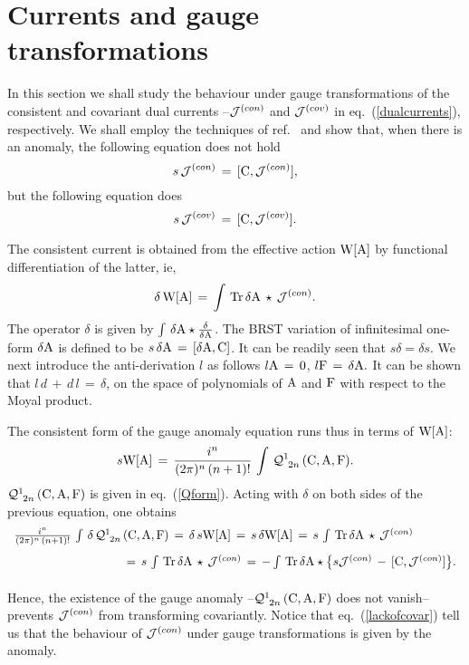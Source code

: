 \documentclass[a4paper,12pt]{article}
\def\cJ{{\cal J}}
\def\cQ{{\cal Q}}
\def\A{{\rm A}}
\def\C{{\rm C}}
\def\F{{\rm F}}
\def\W{{\rm W}}
\begin{document}
\section{Currents and gauge transformations}

In this section we shall study the behaviour under gauge transformations 
of the consistent and covariant dual currents --$\cJ^{(con)}$ and
$\cJ^{(cov)}$ in eq.~(\ref{dualcurrents}), respectively. We shall employ the
techniques of ref.~\cite{Alvarez-Gaume:1985dr} and show that, when
there is an anomaly, the following equation does not hold
\begin{displaymath}
s\,\cJ^{(con)}\,=\,[\C,\cJ^{(con)}],
\end{displaymath} 
but the following equation does
\begin{equation}
s\,\cJ^{(cov)}\,=\,[\C,\cJ^{(cov)}].
\label{covlaw}
\end{equation}

 The consistent current is obtained from the effective action $\W[\A]$ by
functional differentiation of the latter, ie,
\begin{displaymath}
\delta\,\W[\A]\,=\,\int\,{\rm Tr}\,\delta\A\, \star\,\cJ^{(con)}.
\end{displaymath}
The operator $\delta$ is given by $\int\,\delta\A\star\frac{\delta}{\delta\A}$.
The BRST variation of infinitesimal one-form $\delta\A$ is defined to be
$s\,\delta\A\,=\,[\delta\A,\C]$. It can be readily seen that 
$s\delta=\delta s$.
We next introduce the anti-derivation $l$ as follows
$l\A\,=\,0$, $l\F\,=\,\delta\A.$ It can be shown that 
$l\,d\,+\,d\,l\,=\,\delta$, on the space of polynomials of $\A$ and $\F$ 
with respect to the Moyal product. 

The consistent form of the gauge anomaly equation runs thus in terms 
of $\W[\A]$:
\begin{displaymath}
s\W[\A]\,=\,\frac{i^n}{(2\pi)^n\,(n+1)!}\,\int\, \cQ^{1}_{\;\,2n}
\,(\C,\A,\F).  
\end{displaymath}
$\cQ^{1}_{\;\,2n}\,(\C,\A,\F)$ is given in eq.~(\ref{Qform}).  
Acting with $\delta$ on both sides of the previous equation, one obtains
\begin{equation}
\begin{array}{l}
{\frac{i^n}{(2\pi)^n\,(n+1)!}\,\int\, \delta\,\cQ^{1}_{\;\,2n}
\,(\C,\A,\F)\,=\,\delta\,s\W[\A]\,=\,s\,\delta\W[\A]
\,=\,s\,\int\,{\rm Tr}\,\delta\A\, \star\,\cJ^{(con)}}\\[9pt]
{\phantom{\frac{i^n}{(2\pi)^n\,(n+1)!}\,\int\, \delta\,\cQ^{1}_{\;\,2n}}
\,=\,s\,\int\,{\rm Tr}\,\delta\A\, \star\,\cJ^{(con)}
   \,=\,-\int\,{\rm Tr}\,\delta\A\star\big\{s\cJ^{(con)}\,-\,
[\C,\cJ^{(con)}]
\big\}.}\\[9pt]
\end{array}
\label{lackofcovar}
\end{equation}
Hence, the existence of the gauge anomaly 
--$\cQ^{1}_{\;\,2n}\,(\C,\A,\F)$ does not vanish-- prevents $\cJ^{(con)}$ 
from transforming covariantly. Notice that eq.~(\ref{lackofcovar}) tell us 
that the behaviour of $\cJ^{(con)}$ under gauge transformations is given  
by the anomaly. 
\end{document}

